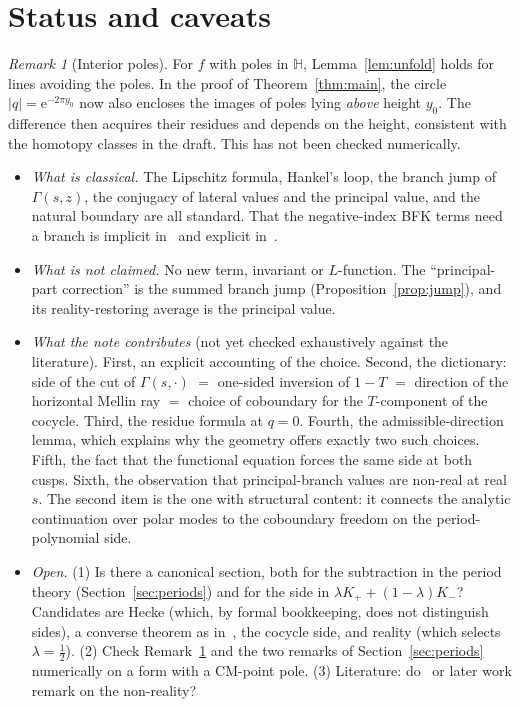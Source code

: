 \documentclass[11pt]{article}
\theoremstyle{definition}
\theoremstyle{remark}
\newtheorem{remark}[theorem]{Remark}
\newcommand{\HH}{\mathbb{H}}
\newcommand{\e}{\mathrm{e}}
\begin{document}
\section{Status and caveats}

\begin{remark}[Interior poles]\label{rem:interior}
For $f$ with poles in $\HH$, Lemma~\ref{lem:unfold} holds for lines avoiding the poles.
In the proof of Theorem~\ref{thm:main}, the circle $|q|=\e^{-2\pi y_0}$ now also encloses the
images of poles lying \emph{above} height $y_0$. The difference then acquires their
residues and depends on the height, consistent with the homotopy classes in the draft.
This has not been checked numerically.
\end{remark}

\begin{itemize}
\item \emph{What is classical.} The Lipschitz formula, Hankel's loop, the branch jump of
$\Gamma(s,z)$, the conjugacy of lateral values and the principal value, and the natural boundary
are all standard. That the negative-index BFK terms need a branch is implicit in~\cite{BFK}
and explicit in~\cite{DLRR}.
\item \emph{What is not claimed.} No new term, invariant or $L$-function. The
``principal-part correction'' is the summed branch jump (Proposition~\ref{prop:jump}), and its
reality-restoring average is the principal value.
\item \emph{What the note contributes} (not yet checked exhaustively against the
literature). First, an explicit accounting of the choice. Second, the dictionary: side of
the cut of $\Gamma(s,\cdot)$ $=$ one-sided inversion of $1-T$ $=$ direction of the horizontal
Mellin ray $=$ choice of coboundary for the $T$-component of the cocycle. Third, the
residue formula at $q=0$. Fourth, the admissible-direction lemma, which explains why the
geometry offers exactly two such choices. Fifth, the fact that the functional equation
forces the same side at both cusps. Sixth, the observation that principal-branch values
are non-real at real $s$. The second item is the one with structural content: it
connects the analytic continuation over polar modes to the coboundary freedom on the
period-polynomial side.
\item \emph{Open.} (1) Is there a canonical section, both for the subtraction in the
period theory (Section~\ref{sec:periods}) and for the side in $\lambda K_++(1-\lambda)K_-$? Candidates are
Hecke (which, by formal bookkeeping, does not distinguish sides), a converse theorem as
in~\cite{DLRR}, the cocycle side, and reality (which selects $\lambda=\tfrac12$). (2) Check
Remark~\ref{rem:interior} and the two remarks of Section~\ref{sec:periods} numerically on a form with
a CM-point pole. (3) Literature: do~\cite{BFK,DLRR} or later work remark on the
non-reality?
\end{itemize}
\end{document}
